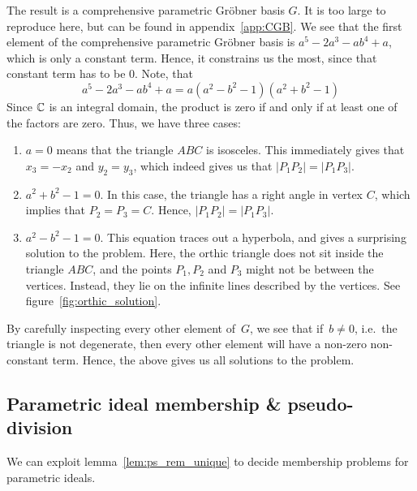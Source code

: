\begin{example}
  The result is a comprehensive parametric Gröbner basis $G$. It is too large to reproduce here, but can be found in appendix~\ref{app:CGB}. We see that the first element of the comprehensive parametric Gröbner basis is $a^{5} - 2a^{3} - ab^{4} + a$, which is only a constant term. Hence, it constrains us the most, since that constant term has to be 0. Note, that
  \[a^{5} - 2a^{3} - ab^{4} + a = a (a^{2} - b^{2} - 1) (a^{2} + b^{2} - 1) \]
  Since $\mathbb{C}$ is an integral domain, the product is zero if and only if at least one of the factors are zero. Thus, we have three cases:
  \begin{enumerate}
    \item $a = 0$ means that the triangle $ABC$ is isosceles. This immediately gives that $x_{3} = -x_{2}$ and $y_{2} = y_{3}$, which indeed gives us that $|P_{1}P_{2}| = |P_{1}P_{3}|$.
    \item $a^{2} + b^{2} - 1 = 0$. In this case, the triangle has a right angle in vertex $C$, which implies that $P_{2} = P_{3} = C$. Hence, $|P_{1}P_{2}| = |P_{1}P_{3}|$.
    \item $a^{2} - b^{2} - 1 = 0$. This equation traces out a hyperbola, and gives a surprising solution to the problem. Here, the orthic triangle does not sit inside the triangle $ABC$, and the points $P_{1}, P_{2}$ and $P_{3}$ might not be between the vertices. Instead, they lie on the infinite lines described by the vertices. See figure~\ref{fig:orthic_solution}.
  \end{enumerate}
  By carefully inspecting every other element of $\,G$, we see that if $\,b \neq 0$, i.e.\ the triangle is not degenerate, then every other element will have a non-zero non-constant term. Hence, the above gives us all solutions to the problem.
\end{example}

















\subsection{Parametric ideal membership \& pseudo-division}\label{sec:ps_div_app}
We can exploit lemma~\ref{lem:ps_rem_unique} to decide membership problems for parametric ideals.

